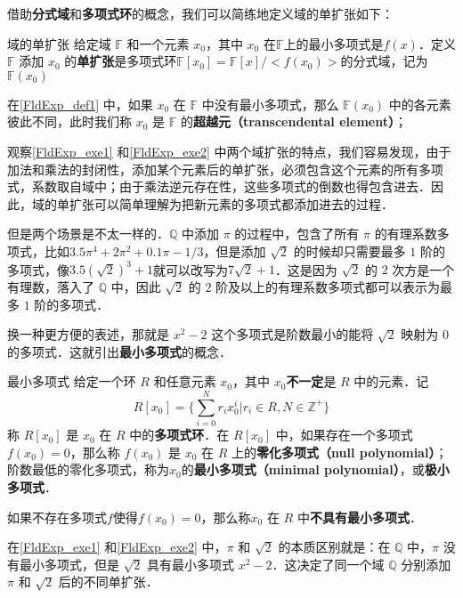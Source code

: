 借助\textbf{分式域}和\textbf{多项式环}的概念，我们可以简练地定义域的单扩张如下：


\begin{definition}{域的单扩张}\label{FldExp_def1}
给定域 $\mathbb{F}$ 和一个元素 $x_0$，其中 $x_0$ 在$\mathbb{F}$上的最小多项式是$f(x)$．定义 $\mathbb{F}$ 添加 $x_0$ 的\textbf{单扩张}是多项式环$\mathbb{F}[x_0]=\mathbb{F}[x]/<f(x_0)>$的分式域，记为$\mathbb{F}(x_0)$
\end{definition}



在\autoref{FldExp_def1} 中，如果 $x_0$ 在 $\mathbb{F}$ 中没有最小多项式，那么 $\mathbb{F}(x_0)$ 中的各元素彼此不同，此时我们称 $x_0$ 是 $\mathbb{F}$ 的\textbf{超越元（transcendental element）}；



观察\autoref{FldExp_exe1} 和\autoref{FldExp_exe2} 中两个域扩张的特点，我们容易发现，由于加法和乘法的封闭性，添加某个元素后的单扩张，必须包含这个元素的所有多项式，系数取自域中；由于乘法逆元存在性，这些多项式的倒数也得包含进去．因此，域的单扩张可以简单理解为把新元素的多项式都添加进去的过程．

但是两个场景是不太一样的．$\mathbb{Q}$ 中添加 $\pi$ 的过程中，包含了所有 $\pi$ 的有理系数多项式，比如$3.5\pi^4+2\pi^2+0.1\pi-1/3$，但是添加 $\sqrt{2}$ 的时候却只需要最多 $1$ 阶的多项式，像$3.5(\sqrt{2})^3+1$就可以改写为$7\sqrt{2}+1$．这是因为 $\sqrt{2}$ 的 $2$ 次方是一个有理数，落入了 $\mathbb{Q}$ 中，因此 $\sqrt{2}$ 的 $2$ 阶及以上的有理系数多项式都可以表示为最多 $1$ 阶的多项式．

换一种更方便的表述，那就是 $x^2-2$ 这个多项式是阶数最小的能将 $\sqrt{2}$ 映射为 $0$ 的多项式．这就引出\textbf{最小多项式}的概念．

\begin{definition}{最小多项式}
给定一个环 $R$ 和任意元素 $x_0$，其中 $x_0$\textbf{不一定}是 $R$ 中的元素．记
$$R[x_0]=\{\sum_{i=0}^N r_ix_0^i|r_i\in R, N\in\mathbb{Z}^+\}$$称 $R[x_0]$ 是 $x_0$ 在 $R$ 中的\textbf{多项式环}．在 $R[x_0]$ 中，如果存在一个多项式 $f(x_0)=0$，那么称 $f(x_0)$ 是 $x_0$ 在 $R$ 上的\textbf{零化多项式（null polynomial）}；阶数最低的零化多项式，称为$x_0$的\textbf{最小多项式（minimal polynomial）}，或\textbf{极小多项式}．

如果不存在多项式$f$使得$f(x_0)=0$，那么称$x_0$ 在 $R$ 中\textbf{不具有最小多项式}．
\end{definition}

在\autoref{FldExp_exe1} 和\autoref{FldExp_exe2} 中，$\pi$ 和 $\sqrt{2}$ 的本质区别就是：在 $\mathbb{Q}$ 中，$\pi$ 没有最小多项式，但是 $\sqrt{2}$ 具有最小多项式 $x^2-2$．这决定了同一个域 $\mathbb{Q}$ 分别添加 $\pi$ 和 $\sqrt{2}$ 后的不同单扩张．

